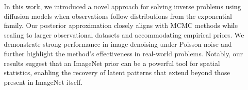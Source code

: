 In this work, we introduced a novel approach for solving inverse problems using diffusion models when observations follow distributions from the exponential family. 
Our posterior approximation closely aligns with MCMC methods while scaling to larger observational datasets and accommodating empirical priors. We demonstrate strong performance in image denoising under Poisson noise and further highlight the method’s effectiveness in real-world problems. Notably, our results suggest that an ImageNet prior can be a powerful tool for spatial statistics, enabling the recovery of latent patterns that extend beyond those present in ImageNet itself.
